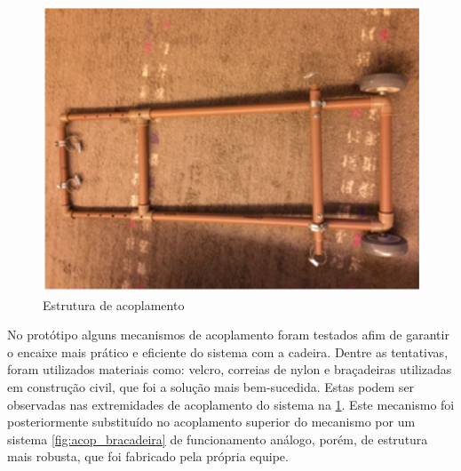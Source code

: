 \begin{figure}[!htb]
\centering
\includegraphics[keepaspectratio=true,scale=0.7]{figuras/resultados/acoplamento}
\caption{Estrutura de acoplamento}
\label{fig:acoplamento}
\end{figure}

No protótipo alguns mecanismos de acoplamento foram testados afim de garantir o encaixe mais prático e eficiente do sistema com a cadeira. Dentre as tentativas, foram utilizados materiais como: velcro, correias de nylon e braçadeiras utilizadas em construção civil, que foi a solução mais bem-sucedida. Estas podem ser observadas nas extremidades de acoplamento do sistema na \ref{fig:acoplamento}. Este mecanismo foi posteriormente substituído no acoplamento superior do mecanismo por um sistema  \ref{fig:acop_bracadeira} de funcionamento análogo, porém, de estrutura mais robusta, que foi fabricado pela própria equipe.


